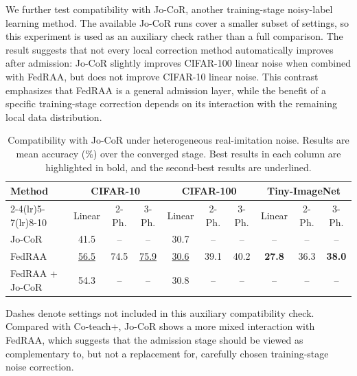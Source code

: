 \documentclass[conference]{IEEEtran}
\theoremstyle{definition}
\theoremstyle{remark}
\begin{document}
We further test compatibility with Jo-CoR, another training-stage noisy-label learning method.
The available Jo-CoR runs cover a smaller subset of settings, so this experiment is used as an auxiliary check rather than a full comparison.
The result suggests that not every local correction method automatically improves after admission: Jo-CoR slightly improves CIFAR-100 linear noise when combined with FedRAA, but does not improve CIFAR-10 linear noise.
This contrast emphasizes that FedRAA is a general admission layer, while the benefit of a specific training-stage correction depends on its interaction with the remaining local data distribution.
\begin{table}[t]
\centering
\caption{Compatibility with Jo-CoR under heterogeneous real-imitation noise. Results are mean accuracy (\%) over the converged stage. Best results in each column are highlighted in bold, and the second-best results are underlined.}
\label{tab:jocor_merged}
\setlength{\tabcolsep}{4pt}
\renewcommand{\arraystretch}{1.10}
\begin{tabular*}{\textwidth}{@{\extracolsep{\fill}}lccccccccc@{}}
\toprule
\multirow{2}{*}{Method}
& \multicolumn{3}{c}{CIFAR-10}
& \multicolumn{3}{c}{CIFAR-100}
& \multicolumn{3}{c}{Tiny-ImageNet} \\
\cmidrule(lr){2-4}\cmidrule(lr){5-7}\cmidrule(lr){8-10}
& Linear & 2-Ph. & 3-Ph.
& Linear & 2-Ph. & 3-Ph.
& Linear & 2-Ph. & 3-Ph. \\
\midrule
Jo-CoR
& 41.5 & -- & --
& 30.7 & -- & --
& -- & -- & -- \\
FedRAA
& \underline{56.5} & 74.5 & \underline{75.9}
& \underline{30.6} & 39.1 & 40.2
& \textbf{27.8} & 36.3 & \textbf{38.0} \\
\midrule
FedRAA + Jo-CoR
& 54.3 & -- & --
& 30.8 & -- & --
& -- & -- & -- \\
\bottomrule
\end{tabular*}
\vspace{2pt}
\parbox{0.95\textwidth}{\footnotesize
Dashes denote settings not included in this auxiliary compatibility check. Compared with Co-teach+, Jo-CoR shows a more mixed interaction with FedRAA, which suggests that the admission stage should be viewed as complementary to, but not a replacement for, carefully chosen training-stage noise correction.}
\end{table}
\end{document}
